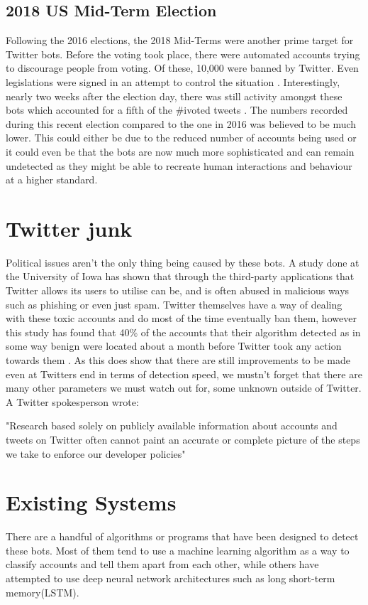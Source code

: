 \subsection{2018 US Mid-Term Election}
Following the 2016 elections, the 2018 Mid-Terms were another prime target for Twitter bots. Before the voting took place, there were automated accounts trying to discourage people from voting. Of these, 10,000 were banned by Twitter. Even legislations were signed in an attempt to control the situation \cite{BBC001}. Interestingly, nearly two weeks after the election day, there was still activity amongst these bots which accounted for a fifth of the \#ivoted tweets \cite{ETimes001}. The numbers recorded during this recent election compared to the one in 2016 was believed to be much lower. This could either be due to the reduced number of accounts being used or it could even be that the bots are now much more sophisticated and can remain undetected as they might be able to recreate human interactions and behaviour at a higher standard.

\section{Twitter junk}
Political issues aren't the only thing being caused by these bots. A study done at the University of Iowa has shown that through the third-party applications that Twitter allows its users to utilise can be, and is often abused in malicious ways such as phishing or even just spam. Twitter themselves have a way of dealing with these toxic accounts and do most of the time eventually ban them, however this study has found that 40\% of the accounts that their algorithm detected as in some way benign were located about a month before Twitter took any action towards them \cite{IOWA001}. As this does show that there are still improvements to be made even at Twitters end in terms of detection speed, we mustn't forget that there are many other parameters we must watch out for, some unknown outside of Twitter. A Twitter spokesperson wrote: 
\begin{displayquote}
	"Research based solely on publicly available information about accounts and tweets on Twitter often cannot paint an accurate or complete picture of the steps we take to enforce our developer policies" \cite{Wired001}
\end{displayquote}


\section{Existing Systems}
There are a handful of algorithms or programs that have been designed to detect these bots. Most of them tend to use a machine learning algorithm as a way to classify accounts and tell them apart from each other, while others have attempted to use deep neural network architectures such as long short-term memory(LSTM).  



